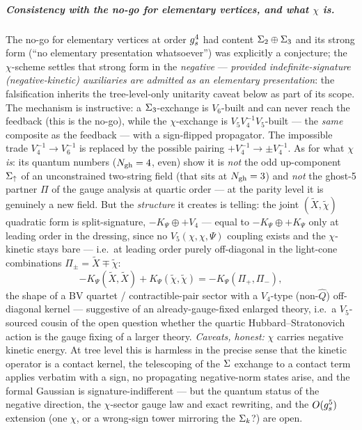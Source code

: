 \subparagraph{Consistency with the no-go for elementary vertices, and what $\chi$ is.} The no-go for elementary vertices at order $g_s^4$
had content $\Sigma_2\oplus\Sigma_3$ and its strong form (\enquote{no elementary
presentation whatsoever}) was explicitly a conjecture; the $\chi$-scheme settles that
strong form in the \emph{negative} --- \emph{provided indefinite-signature
(negative-kinetic) auxiliaries are admitted as an elementary presentation}: the
falsification inherits the tree-level-only unitarity caveat below as part of its
scope. The mechanism is instructive: a $\Sigma_3$-exchange is
$V_6$-built and can never reach the feedback (this is the no-go), while the
$\chi$-exchange is $V_5V_4^{-1}V_5$-built --- the \emph{same} composite as the feedback
--- with a sign-flipped propagator. The impossible trade $V_4^{-1}\to V_6^{-1}$ is
replaced by the possible pairing $+V_4^{-1}\to\pm V_4^{-1}$. As for what $\chi$
\emph{is}: its quantum numbers ($N_{\text{gh}}=4$, even) show it is \emph{not} the odd
up-component $\Sigma_\uparrow$ of an unconstrained two-string field (that sits at
$N_{\text{gh}}=3$) and \emph{not} the ghost-5 partner $\Pi$ of the gauge analysis at quartic order --- at the parity
level it is genuinely a new field. But the \emph{structure} it creates is telling: the
joint $(\tilde X,\tilde\chi)$ quadratic form is split-signature,
$-K_\Psi\oplus+V_4$ --- equal to $-K_\Psi\oplus+K_\Psi$ only at leading order in
the dressing, since no $V_5(\chi,\chi,\Psi)$ coupling exists and the $\chi$-kinetic
stays bare --- i.e.\ at leading order purely off-diagonal in the light-cone
combinations $\Pi_\pm=\tilde X\mp\tilde\chi$:
\begin{equation}
	-K_\Psi(\tilde X,\tilde X)+K_\Psi(\tilde\chi,\tilde\chi)
	=-K_\Psi(\Pi_+,\Pi_-),
	\label{ped:eq:lightcone}
\end{equation}
the shape of a BV quartet / contractible-pair sector with a $V_4$-type (non-$\hat Q$)
off-diagonal kernel --- suggestive of an already-gauge-fixed enlarged theory, i.e.\ a
$V_5$-sourced cousin of the open question whether the quartic Hubbard--Stratonovich action is the gauge fixing of a larger theory. \emph{Caveats, honest:}
$\chi$ carries negative kinetic energy. At tree level this is harmless in the precise
sense that the kinetic operator is a contact kernel, the
telescoping of the $\Sigma$ exchange to a contact term applies verbatim with a sign, no propagating
negative-norm states arise, and the formal Gaussian is signature-indifferent
--- but the quantum status of the negative direction, the
$\chi$-sector gauge law and exact rewriting, and the $O(g_s^5)$ extension (one $\chi$,
or a wrong-sign tower mirroring the $\Sigma_k$?) are open.

